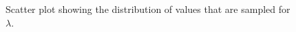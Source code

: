 \documentclass{article}
\begin{document}
\newpage
\begin{figure}[H]
	\centerline{
		}
	\caption{Scatter plot showing the distribution of values that are sampled for $\lambda$.}
	\label{1.fig:r2_scat_L}
\end{figure}
\end{document}
